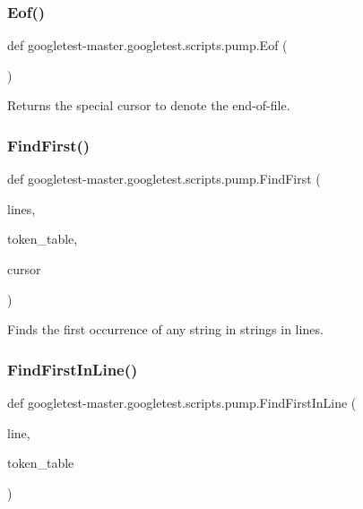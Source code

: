 \subsubsection{\texorpdfstring{Eof()}{Eof()}}
{\footnotesize\ttfamily def googletest-\/master.\+googletest.\+scripts.\+pump.\+Eof (\begin{DoxyParamCaption}{ }\end{DoxyParamCaption})}

\begin{DoxyVerb}Returns the special cursor to denote the end-of-file.\end{DoxyVerb}
 \mbox{\label{namespacegoogletest-master_1_1googletest_1_1scripts_1_1pump_a2830a0e2b98580528299da5d83efe04e}} 
\subsubsection{\texorpdfstring{FindFirst()}{FindFirst()}}
{\footnotesize\ttfamily def googletest-\/master.\+googletest.\+scripts.\+pump.\+Find\+First (\begin{DoxyParamCaption}\item[{}]{lines,  }\item[{}]{token\+\_\+table,  }\item[{}]{cursor }\end{DoxyParamCaption})}

\begin{DoxyVerb}Finds the first occurrence of any string in strings in lines.\end{DoxyVerb}
 \mbox{\label{namespacegoogletest-master_1_1googletest_1_1scripts_1_1pump_af8f0f5a0e136ebd1947b1d583aadc319}} 
\subsubsection{\texorpdfstring{FindFirstInLine()}{FindFirstInLine()}}
{\footnotesize\ttfamily def googletest-\/master.\+googletest.\+scripts.\+pump.\+Find\+First\+In\+Line (\begin{DoxyParamCaption}\item[{}]{line,  }\item[{}]{token\+\_\+table }\end{DoxyParamCaption})}

